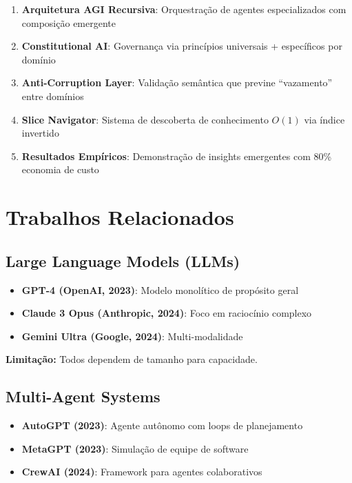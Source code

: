 \documentclass[11pt]{article}
\begin{document}
\begin{enumerate}
    \item \textbf{Arquitetura AGI Recursiva}: Orquestração de agentes especializados com composição emergente
    \item \textbf{Constitutional AI}: Governança via princípios universais + específicos por domínio
    \item \textbf{Anti-Corruption Layer}: Validação semântica que previne ``vazamento'' entre domínios
    \item \textbf{Slice Navigator}: Sistema de descoberta de conhecimento $O(1)$ via índice invertido
    \item \textbf{Resultados Empíricos}: Demonstração de insights emergentes com 80\% economia de custo
\end{enumerate}

\section{Trabalhos Relacionados}

\subsection{Large Language Models (LLMs)}

\begin{itemize}
    \item \textbf{GPT-4 (OpenAI, 2023)}: Modelo monolítico de propósito geral
    \item \textbf{Claude 3 Opus (Anthropic, 2024)}: Foco em raciocínio complexo
    \item \textbf{Gemini Ultra (Google, 2024)}: Multi-modalidade
\end{itemize}

\textbf{Limitação:} Todos dependem de tamanho para capacidade.

\subsection{Multi-Agent Systems}

\begin{itemize}
    \item \textbf{AutoGPT (2023)}: Agente autônomo com loops de planejamento
    \item \textbf{MetaGPT (2023)}: Simulação de equipe de software
    \item \textbf{CrewAI (2024)}: Framework para agentes colaborativos
\end{itemize}
\end{document}
